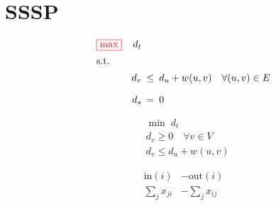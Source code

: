 \section{SSSP}

\begin{frame}
  \begin{equation*}
	\setlength\arraycolsep{2.5pt}
	\begin{array}{l@{\quad}rcl}
	  \color{red}{\boxed{\max}} 	& d_t	& &	\\[5pt]
	  \text{s.t.} 	& &	\\[5pt]
			& d_v   &\leq& d_u + w(u,v) \quad \forall (u,v) \in E	\\[10pt]
			& d_s	&=& 0 
	\end{array}
  \end{equation*}

  \vspace{0.60cm}

  \begin{align*}
	& \min \; d_t	\\
	& d_v \geq 0 \quad \forall v \in V \\
	& d_v \leq d_u + w(u,v)
  \end{align*}
\end{frame}
\begin{frame}{}
  \begin{align*}
	\text{in}(i) &- \text{out}(i)	\\
	\sum_{j} x_{ji} &- \sum_{j} x_{ij}	
  \end{align*}


\end{frame}
